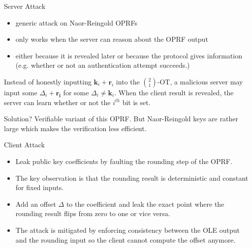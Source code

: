 \documentclass[10pt]{beamer}
\newcommand{\kkk}{\mathbf{k}}
\newcommand{\bv}[1]{\mathbf{#1}}
\begin{document}
    \begin{frame}{Server Attack}
      \begin{itemize}
        \item generic attack on Naor-Reingold OPRFs \pause
        \item only works when the server can
          reason about the OPRF output \pause
        \item either because it is revealed later or because the
          protocol gives information (e.g. whether or not an authentication attempt
          succeeds.)  \pause
      \end{itemize}
  
      \begin{example}
        Instead of honestly inputting $\kkk_i+\bv{r}_i$ into the $2\choose 1$-OT, a
        malicious server may input some $\Delta_i+\bv{r_i}$ for some $\Delta_i \neq
        \kkk_i$. When the client result is revealed, the server can learn whether or not the
        $i^{th}$ bit is set.
      \end{example}\pause
      Solution? \alert{Verifiable}
      variant of this OPRF. \pause But
      Naor-Reingold keys are rather large which makes the verification less
      efficient. 
    \end{frame}
  
    \begin{frame}{Client Attack}
      \begin{itemize}
        \item Leak public key coefficients by faulting the rounding step of
          the OPRF. \pause
        \item The key observation is that the rounding result is \alert{deterministic
          and constant for fixed inputs}. \pause
        \item Add an offset $\Delta$ to the coefficient and leak the exact point where the rounding
          result flips from zero to one or vice versa. \pause
        \item
          The attack is mitigated by enforcing \alert{consistency} between the OLE output
          and the rounding input so the client cannot compute the offset anymore.
      \end{itemize}
    \end{frame}
\end{document}

